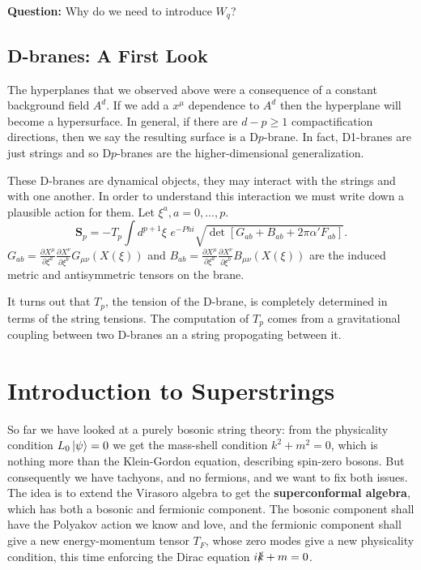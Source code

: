 \documentclass{report}
\theoremstyle{plain}
\theoremstyle{definition}
\theoremstyle{remark}
\newcommand{\PP}[2]{\frac{\di {#1}}{\di {#2}}}
\newcommand{\di}{\partial}
\begin{document}
\textbf{Question:} Why do we need to introduce $W_q$?

\section{D-branes: A First Look}
The hyperplanes that we observed above were a consequence of a constant
background field $A^d$. If we add a $x^\mu$ dependence to $A^d$ then the
hyperplane will become a hypersurface.  In general, if there are $d-p\ge1$
compactification directions, then we say the resulting surface is a
D$p$-brane. In fact, D1-branes are just strings and so D$p$-branes are the
higher-dimensional generalization. 

These D-branes are dynamical objects, they may interact with the strings 
and with one another. In order to understand this interaction we must write
down a plausible action for them. Let $\xi^a,a=0,\dots,p$.
\[ \bm S_p = -T_p\int d^{p+1}\xi\,\, e^{-Phi}
\sqrt{\det\left[ G_{ab}+B_{ab}+2\pi\alpha' F_{ab} \right]}.\]
$G_{ab} = \PP{X^\mu}{\xi^a}\PP{X^\nu}{\xi^b} G_{\mu\nu}(X(\xi))$ and
$B_{ab} = \PP{X^\mu}{\xi^a}\PP{X^\nu}{\xi^b} B_{\mu\nu}(X(\xi))$ are the
induced metric and antisymmetric tensors on the brane.

It turns out that $T_p$, the tension of the D-brane, is completely
determined in terms of the string tensions. The computation of $T_p$ comes
from a gravitational coupling between two D-branes an a string propogating
between it.

\chapter{Introduction to Superstrings}

So far we have looked at a purely bosonic string theory: from the
physicality condition $L_0\ket{\psi} = 0$ we get the mass-shell
condition $k^2 + m^2 = 0$, which is nothing more than the Klein-Gordon
equation, describing spin-zero bosons. But consequently we have
tachyons, and no fermions, and we want to fix both issues. The idea is
to extend the Virasoro algebra to get the {\bf superconformal
  algebra}, which has both a bosonic and fermionic component. The
bosonic component shall have the Polyakov action we know and love, and
the fermionic component shall give a new energy-momentum tensor $T_F$,
whose zero modes give a new physicality condition, this time enforcing
the Dirac equation $i\slashed{k} + m = 0$.
\end{document}
